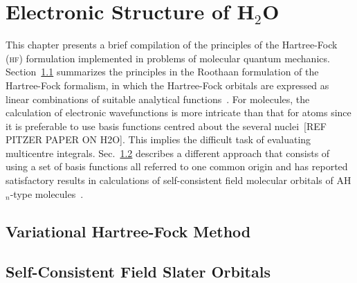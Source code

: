 
\chapter{Electronic Structure of H$_{2}$O}
\label{cha:scf_h2o}




This chapter presents a brief compilation of the principles of the
Hartree-Fock (\textsc{hf}) formulation implemented in problems of
molecular quantum mechanics. Section~\ref{ch:var_hf} summarizes the
principles in the Roothaan formulation of the Hartree-Fock formalism,
in which the Hartree-Fock orbitals are expressed as linear
combinations of suitable analytical functions~\cite{Roothaan_HF}. For
molecules, the calculation of electronic wavefunctions is more
intricate than that for atoms since it is preferable to use basis
functions centred about the several nuclei~[REF PITZER PAPER ON
  H2O]. This implies the difficult task of evaluating multicentre
integrals. Sec.~\ref{ch:scf_sto} describes a different approach that
consists of using a set of basis functions all referred to one common
origin and has reported satisfactory results in calculations of
self-consistent field molecular orbitals of AH$_{n}$-type
molecules~\cite{Moccia_JCP_2164, Moccia_1964}.




\section{Variational Hartree-Fock Method}
\label{ch:var_hf}

\section{Self-Consistent Field Slater Orbitals}
\label{ch:scf_sto}




